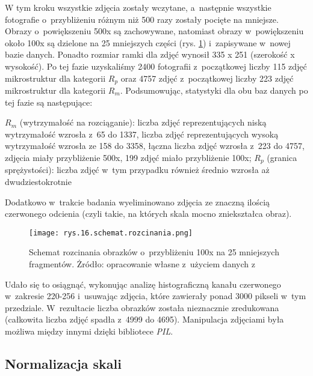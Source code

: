 W tym kroku wszystkie zdjęcia zostały wczytane, a~następnie wszystkie fotografie o~przybliżeniu różnym niż 500 razy zostały pocięte na mniejsze. Obrazy o~powiększeniu 500x są zachowywane, natomiast obrazy w~powiększeniu około 100x są dzielone na 25 mniejszych części (rys. \ref{fig:mesh16}) i~zapisywane w~nowej bazie danych. Ponadto rozmiar ramki dla zdjęć wynosił 335 x 251 (szerokość x  wysokość). Po tej fazie uzyskaliśmy 2400 fotografii z~początkowej liczby 115 zdjęć mikrostruktur dla kategorii $R_{p}$ oraz 4757 zdjęć z~początkowej liczby 223 zdjęć mikrostruktur dla kategorii $R_{m}$. Podsumowując, statystyki dla obu baz danych po tej fazie są następujące:
\begin{outline}
	\1 $R_{m}$ (wytrzymałość na rozciąganie):
		\2 liczba zdjęć reprezentujących niską wytrzymałość wzrosła z~65 do 1337,
		\2 liczba zdjęć reprezentujących wysoką wytrzymałość wzrosła ze 158 do 3358,
		\2 łączna liczba zdjęć wzrosła z~223 do 4757,
		 zdjęcia miały przybliżenie 500x, 199 zdjęć miało przybliżenie 100x;
	\1 $R_{p}$ (granica sprężystości):
		\2 liczba zdjęć w~tym przypadku również średnio wzrosła aż dwudziestokrotnie
\end{outline}
Dodatkowo w~trakcie badania wyeliminowano zdjęcia ze znaczną ilością czerwonego odcienia (czyli takie, na których skala mocno zniekształca obraz).
\begin{figure}[h]
    \centering
    \texttt{[image: rys.16.schemat.rozcinania.png]}
    \caption{Schemat rozcinania obrazków o~przybliżeniu 100x na 25 mniejszych fragmentów. Żródło: opracowanie własne z~użyciem danych z~\cite{Pirowski17}}
    \label{fig:mesh16}
\end{figure}
Udało się to osiągnąć, wykonując analizę histograficzną kanału czerwonego w~zakresie 220-256 i~usuwając zdjęcia, które zawierały ponad 3000 pikseli w~tym przedziale. W~rezultacie liczba obrazków została nieznacznie zredukowana (całkowita liczba zdjęć spadła z~4999 do 4695). Manipulacja zdjęciami była możliwa między innymi dzięki bibliotece \textit{PIL}. %


\subsection{Normalizacja skali}
\label{sec:normalizacja_skali}

